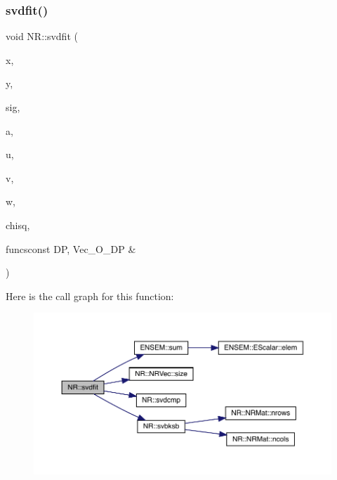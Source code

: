 \subsubsection{\texorpdfstring{svdfit()}{svdfit()}}
{\footnotesize\ttfamily void N\+R\+::svdfit (\begin{DoxyParamCaption}\item[{\mbox{\hyperlink{namespaceNR_a9f943da53862537c552e2a770cb170ae}{Vec\+\_\+\+I\+\_\+\+DP}} \&}]{x,  }\item[{\mbox{\hyperlink{namespaceNR_a9f943da53862537c552e2a770cb170ae}{Vec\+\_\+\+I\+\_\+\+DP}} \&}]{y,  }\item[{\mbox{\hyperlink{namespaceNR_a9f943da53862537c552e2a770cb170ae}{Vec\+\_\+\+I\+\_\+\+DP}} \&}]{sig,  }\item[{\mbox{\hyperlink{namespaceNR_a970094d23441f8ef6a45282a7eb2103d}{Vec\+\_\+\+O\+\_\+\+DP}} \&}]{a,  }\item[{\mbox{\hyperlink{namespaceNR_adc1f8da33094b6bbeb1f5f899515ce54}{Mat\+\_\+\+O\+\_\+\+DP}} \&}]{u,  }\item[{\mbox{\hyperlink{namespaceNR_adc1f8da33094b6bbeb1f5f899515ce54}{Mat\+\_\+\+O\+\_\+\+DP}} \&}]{v,  }\item[{\mbox{\hyperlink{namespaceNR_a970094d23441f8ef6a45282a7eb2103d}{Vec\+\_\+\+O\+\_\+\+DP}} \&}]{w,  }\item[{\mbox{\hyperlink{namespaceNR_af6ff762dd605ff477b8e52387253a02a}{DP}} \&}]{chisq,  }\item[{void }]{funcsconst D\+P, Vec\+\_\+\+O\+\_\+\+D\+P \& }\end{DoxyParamCaption})}

Here is the call graph for this function\+:
\nopagebreak
\begin{figure}[H]
\begin{center}
\leavevmode
\includegraphics[width=350pt]{da/d46/namespaceNR_afe44878304edad27239234f84f643943_cgraph}
\end{center}
\end{figure}
\mbox{\label{namespaceNR_a7718198c5af1e10344d7c8933fe579c5}} 
